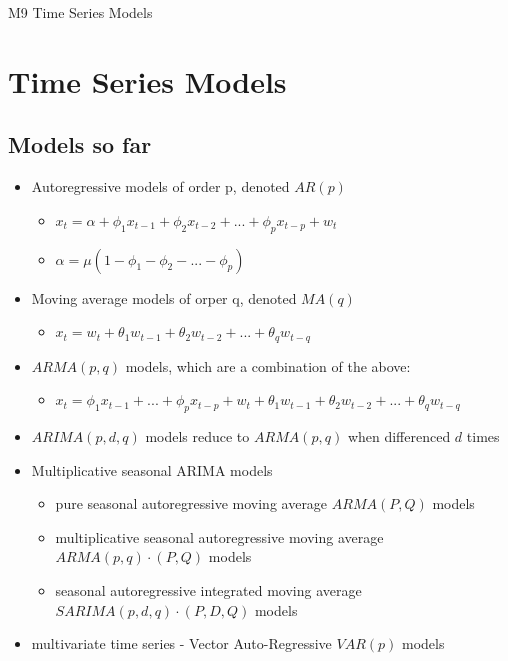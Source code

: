\documentclass{article}
\begin{document}
\pagebreak

\begin{center}
    \Large{M9 Time Series Models}
\end{center}

\section{Time Series Models}

\subsection{Models so far}
\begin{itemize}
    \item Autoregressive models of order p, denoted $AR(p)$
    \begin{itemize}
        \item $x_t = \alpha + \phi_1 x_{t-1} + \phi_2 x_{t-2} + ... + \phi_p x_{t-p} + w_t$
        \item $\alpha = \mu (1 - \phi_1 - \phi_2 - ... - \phi_p)$
    \end{itemize}
    \item Moving average models of orper q, denoted $MA(q)$
    \begin{itemize}
        \item $x_t = w_t + \theta_1 w_{t-1} + \theta_2 w_{t-2} + ... + \theta_q w_{t-q}$
    \end{itemize}
    \item $ARMA(p,q)$ models, which are a combination of the above:
    \begin{itemize}
        \item $x_t = \phi_1 x_{t-1} + ... + \phi_p x_{t-p} + w_t + \theta_1 w_{t-1} + \theta_2 w_{t-2} + ... + \theta_q w_{t-q}$
    \end{itemize}
    \item $ARIMA(p,d,q)$ models reduce to $ARMA(p,q)$ when differenced $d$ times
    \item Multiplicative seasonal ARIMA models
    \begin{itemize}
        \item pure seasonal autoregressive moving average $ARMA(P,Q)$ models
        \item multiplicative seasonal autoregressive moving average $ARMA(p,q) \cdot (P,Q)$ models
        \item seasonal autoregressive integrated moving average $SARIMA(p,d,q) \cdot (P,D,Q)$ models
    \end{itemize}
    \item multivariate time series - Vector Auto-Regressive $VAR(p)$ models
\end{itemize}
\end{document}
